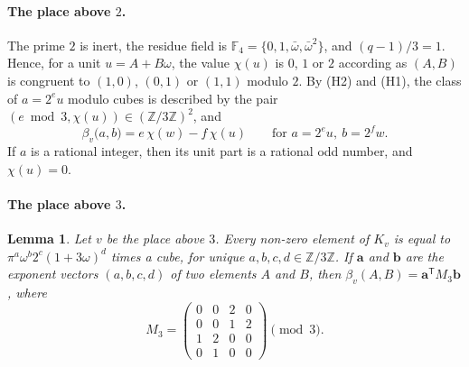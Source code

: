 \documentclass[11pt]{article}
\newtheorem{lemma}[theorem]{Lemma}
\newcommand{\Z}{\mathbb{Z}}
\newcommand{\F}{\mathbb{F}}
\begin{document}
\paragraph{The place above $2$.} The prime $2$ is inert, the residue field is $\F_4=\{0,1,\bar\omega,\bar\omega^2\}$, and $(q-1)/3=1$. Hence, for a unit $u=A+B\omega$, the value $\chi(u)$ is $0$, $1$ or $2$ according as $(A,B)$ is congruent to $(1,0)$, $(0,1)$ or $(1,1)$ modulo $2$. By (H2) and (H1), the class of $a=2^eu$ modulo cubes is described by the pair $(e\bmod3,\chi(u))\in(\Z/3\Z)^2$, and
\begin{equation}\label{eq:beta2}
\beta_v\bigl(a,b\bigr)=e\,\chi(w)-f\,\chi(u)\qquad\text{for }a=2^eu,\ b=2^fw.
\end{equation}
If $a$ is a rational integer, then its unit part is a rational odd number, and $\chi(u)=0$.

\paragraph{The place above $3$.}
\begin{lemma}\label{lem:M3}
Let $v$ be the place above $3$. Every non-zero element of $K_v$ is equal to $\pi^a\omega^b2^c(1+3\omega)^d$ times a cube, for unique $a,b,c,d\in\Z/3\Z$. If $\mathbf a$ and $\mathbf b$ are the exponent vectors $(a,b,c,d)$ of two elements $A$ and $B$, then $\beta_v(A,B)=\mathbf a^{\mathsf T}M_3\mathbf b$, where
\[
M_3=\begin{pmatrix}0&0&2&0\\0&0&1&2\\1&2&0&0\\0&1&0&0\end{pmatrix}\pmod3.
\]
\end{lemma}
\end{document}
